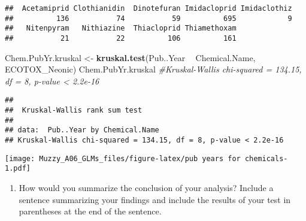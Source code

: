 \documentclass[]{article}
\newenvironment{Shaded}{\begin{snugshade}}{\end{snugshade}}
\newcommand{\KeywordTok}[1]{\textcolor[rgb]{0.13,0.29,0.53}{\textbf{#1}}}
\newcommand{\DataTypeTok}[1]{\textcolor[rgb]{0.13,0.29,0.53}{#1}}
\newcommand{\StringTok}[1]{\textcolor[rgb]{0.31,0.60,0.02}{#1}}
\newcommand{\CommentTok}[1]{\textcolor[rgb]{0.56,0.35,0.01}{\textit{#1}}}
\newcommand{\OperatorTok}[1]{\textcolor[rgb]{0.81,0.36,0.00}{\textbf{#1}}}
\newcommand{\NormalTok}[1]{#1}
\providecommand{\tightlist}{%
  \setlength{\itemsep}{0pt}\setlength{\parskip}{0pt}}
\begin{document}
\begin{verbatim}
##  Acetamiprid Clothianidin  Dinotefuran Imidacloprid Imidaclothiz 
##          136           74           59          695            9 
##   Nitenpyram   Nithiazine  Thiacloprid Thiamethoxam 
##           21           22          106          161
\end{verbatim}

\begin{Shaded}
\begin{Highlighting}[]
\NormalTok{Chem.PubYr.kruskal <-}\StringTok{ }\KeywordTok{kruskal.test}\NormalTok{(Pub..Year }\OperatorTok{~}\StringTok{ }\NormalTok{Chemical.Name, ECOTOX_Neonic)}
\NormalTok{Chem.PubYr.kruskal }\CommentTok{#Kruskal-Wallis chi-squared = 134.15, df = 8, p-value < 2.2e-16}
\end{Highlighting}
\end{Shaded}

\begin{verbatim}
## 
##  Kruskal-Wallis rank sum test
## 
## data:  Pub..Year by Chemical.Name
## Kruskal-Wallis chi-squared = 134.15, df = 8, p-value < 2.2e-16
\end{verbatim}

\begin{Shaded}
\end{Shaded}

\texttt{[image: Muzzy\_A06\_GLMs\_files/figure-latex/pub years for chemicals-1.pdf]}

\begin{enumerate}
\def\labelenumi{\arabic{enumi}.}
\setcounter{enumi}{8}
\tightlist
\item
  How would you summarize the conclusion of your analysis? Include a
  sentence summarizing your findings and include the results of your
  test in parentheses at the end of the sentence.
\end{enumerate}
\end{document}

